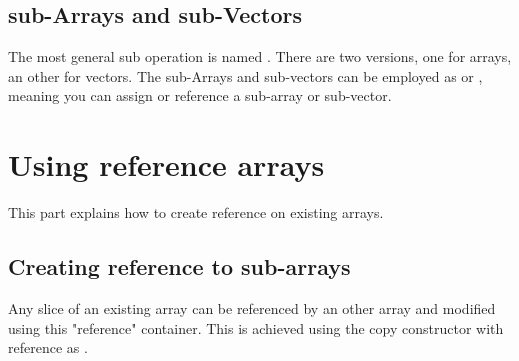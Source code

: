 \documentclass[a4paper,10pt]{article}
\begin{document}
\begin{minipage}[t]{0.5\textwidth}

\end{minipage}
\hspace{0.2cm}
\begin{minipage}[t]{0.5\textwidth}
\addtocounter{lstlisting}{-1}

\end{minipage}


\subsection{sub-Arrays and sub-Vectors}

The most general sub operation  is named . There are two versions, one
for arrays, an other for vectors. The sub-Arrays and sub-vectors can be
employed as  or , meaning you can assign or reference a
sub-array or sub-vector.

\begin{minipage}[t]{0.5\textwidth}

\end{minipage}
\hspace{0.2cm}
\begin{minipage}[t]{0.5\textwidth}
\addtocounter{lstlisting}{-1}

\end{minipage}

\section{Using reference arrays}

This part explains how to create reference on existing arrays.

\subsection{Creating reference to sub-arrays}

Any slice of an existing array can be referenced by an other array
and modified using this "reference" container. This is achieved
using the copy constructor with reference as .

\begin{minipage}[t]{0.5\textwidth}

\end{minipage}
\hspace{0.2cm}
\begin{minipage}[t]{0.5\textwidth}
\addtocounter{lstlisting}{-1}

\end{minipage}
\end{document}
